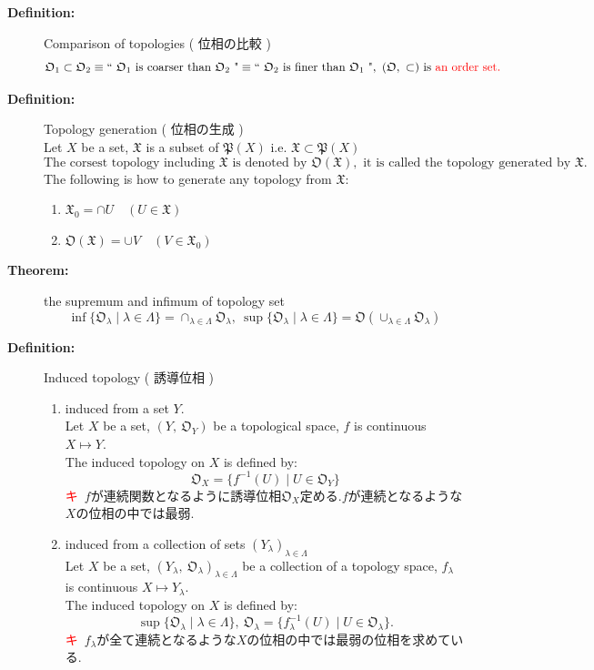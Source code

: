 \documentclass[english,dvipdfmx]{jsarticle}
\newcommand*{\point}{\textcircled{\textcolor{red}{\scriptsize キ}}}
\begin{document}
\begin{description}
    \item[\bf{Definition:}] Comparison of topologies ( 位相の比較 )
        $$\mathfrak{O}_1 \subset \mathfrak{O}_2 \equiv \text{`` } \mathfrak{O}_1 \text{ is coarser than } \mathfrak{O}_2 \text{ "}\equiv \text{`` } \mathfrak{O}_2 \text{ is finer than } \mathfrak{O}_1 \text{ "},\ ( \mathfrak{O},\ \subset) \text{ is \color{red}{an order set.}}$$
    
    \item[\bf{Definition:}] Topology generation ( 位相の生成 )\\
        Let $X$ be a set, $\mathfrak{X}$ is a subset of $\mathfrak{P}(X)$ i.e. $\mathfrak{X} \subset \mathfrak{P}(X)$
        $$ \text{The corsest topology including }\mathfrak{X}  \text{ is denoted by } \mathfrak{O}(\mathfrak{X}),\text{ it is called the topology generated by }\mathfrak{X}.$$
        The following is how to generate any topology from $\mathfrak{X}$:
        \begin{enumerate}
            \item $\mathfrak{X_0} = \cap U \quad ( U \in \mathfrak{X} )$
            \item $\mathfrak{O}(\mathfrak{X}) = \cup V \quad ( V \in \mathfrak{X_0} )$
        \end{enumerate}
    
    \item[\bf{Theorem:}] the supremum and infimum of topology set
        $$\inf\{ \mathfrak{O}_{\lambda} \mid \lambda \in \Lambda \} = \cap_{\lambda \in \Lambda} \mathfrak{O}_{\lambda} ,\ \sup\{ \mathfrak{O}_{\lambda} \mid \lambda \in \Lambda \} = \mathfrak{O}(\cup_{\lambda \in \Lambda} \mathfrak{O}_{\lambda})$$

    \item[\bf{Definition:}] Induced topology ( 誘導位相 )
        \begin{enumerate}
            \item induced from a set $Y$. \\
            Let $X$ be a set, $( Y,\ \mathfrak{O}_Y )$ be a topological space, $f$ is continuous $X \mapsto Y$. \\
            The induced topology on $X$ is defined by:
            $$\mathfrak{O}_{X} = \{ f^{-1} (U) \mid U \in \mathfrak{O}_{Y}\}$$
            \point \ $f$が連続関数となるように誘導位相$\mathfrak{O}_{X}$定める.$f$が連続となるような$X$の位相の中では最弱.
            \item induced from a collection of sets $( Y_{\lambda})_{\lambda \in \Lambda}$ \\
            Let $X$ be a set, $( Y_{\lambda},\ \mathfrak{O}_{\lambda} )_{\lambda \in \Lambda}$ be a collection of a topology space, $f_{\lambda}$ is continuous $X \mapsto Y_{\lambda}$. \\
            The induced topology on $X$ is defined by:
            $$\sup \{ \mathfrak{O}_{\lambda} \mid \lambda \in \Lambda \} ,\ \mathfrak{O}_{\lambda} = \{ f_{\lambda}^{-1} (U) \mid U \in \mathfrak{O}_{\lambda}\}. $$
            \point \ $f_{\lambda}$が全て連続となるような$X$の位相の中では最弱の位相を求めている.
        \end{enumerate}


\end{description}
\end{document}
